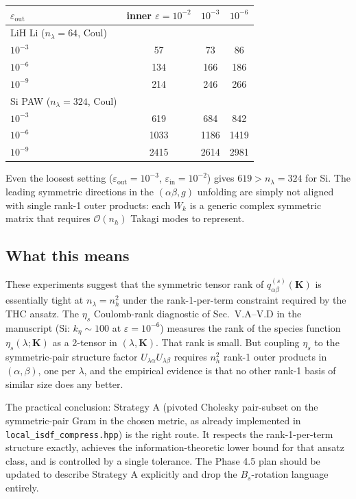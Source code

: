 \documentclass[aps,prb,reprint,superscriptaddress,nofootinbib]{revtex4-2}
\begin{document}
\begin{table}[h]
\centering
\begin{tabular}{lccc}
\hline
\(\varepsilon_{\text{out}}\) & inner \(\varepsilon=10^{-2}\) & \(10^{-3}\) & \(10^{-6}\) \\
\hline
LiH Li (\(n_\lambda=64\), Coul) \\
\quad \(10^{-3}\) & 57 & 73  & 86 \\
\quad \(10^{-6}\) & 134 & 166 & 186 \\
\quad \(10^{-9}\) & 214 & 246 & 266 \\
Si PAW (\(n_\lambda=324\), Coul) \\
\quad \(10^{-3}\) & 619 & 684 & 842 \\
\quad \(10^{-6}\) & 1033 & 1186 & 1419 \\
\quad \(10^{-9}\) & 2415 & 2614 & 2981 \\
\hline
\end{tabular}
\end{table}

Even the loosest setting (\(\varepsilon_{\text{out}}=10^{-3}\),
\(\varepsilon_{\text{in}}=10^{-2}\)) gives \(619>n_\lambda=324\) for
Si.  The leading symmetric directions in the
\((\alpha\beta,g)\) unfolding are simply not aligned with single rank-1
outer products: each \(W_k\) is a generic complex symmetric matrix
that requires \(\mathcal O(n_h)\) Takagi modes to represent.

\subsection{What this means}

These experiments suggest that the symmetric tensor rank of
\(q^{(s)}_{\alpha\beta}(\mathbf K)\) is essentially tight at
\(n_\lambda=n_h^2\) under the rank-1-per-term constraint required by
the THC ansatz.  The \(\eta_s\) Coulomb-rank diagnostic of
Sec.~V.A--V.D in the manuscript (Si: \(k_\eta\sim 100\) at
\(\varepsilon=10^{-6}\)) measures the rank of the species function
\(\eta_s(\lambda;\mathbf K)\) as a 2-tensor in \((\lambda,\mathbf K)\).
That rank is small.  But coupling \(\eta_s\) to the symmetric-pair
structure factor \(U_{\lambda\alpha}U_{\lambda\beta}\) requires
\(n_h^2\) rank-1 outer products in \((\alpha,\beta)\), one per
\(\lambda\), and the empirical evidence is that no other rank-1 basis
of similar size does any better.

The practical conclusion: Strategy A (pivoted Cholesky pair-subset on
the symmetric-pair Gram in the chosen metric, as already implemented
in \texttt{local\_isdf\_compress.hpp}) is the right route.  It
respects the rank-1-per-term structure exactly, achieves the
information-theoretic lower bound for that ansatz class, and is
controlled by a single tolerance.  The Phase 4.5 plan should be
updated to describe Strategy A explicitly and drop the
\(B_s\)-rotation language entirely.
\end{document}
